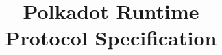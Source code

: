 \documentclass{book}
\begin{document}
\title{
  Polkadot Runtime\\
  {\Large Protocol Specification}
}

\date{}

\maketitle

{\tableofcontents}



\begin{appendix}
\end{appendix}
\end{document}
